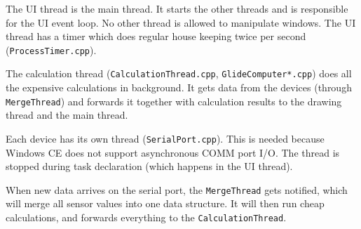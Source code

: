 \documentclass[a4paper,12pt]{refrep}
\begin{document}

The UI thread is the main thread.  It starts the other threads and is
responsible for the UI event loop.  No other thread is allowed to
manipulate windows.  The UI thread has a timer which does regular
house keeping twice per second (\texttt{Pro\-cess\-Ti\-mer.cpp}).

The calculation thread (\texttt{Calcu\-la\-tion\-Thread.cpp},
\texttt{Glide\-Com\-pu\-ter*.cpp}) does all the expensive calculations
in background.  It gets data from the devices (through
\texttt{Merge\-Thread}) and forwards it together with calculation
results to the drawing thread and the main thread.

Each device has its own thread (\texttt{Serial\-Port.cpp}).  This is
needed because Windows CE does not support asynchronous COMM port I/O.
The thread is stopped during task declaration (which happens in the UI
thread).

When new data arrives on the serial port, the \texttt{Merge\-Thread}
gets notified, which will merge all sensor values into one data
structure.  It will then run cheap calculations, and forwards
everything to the \texttt{Calcu\-la\-tion\-Thread}.
\end{document}
